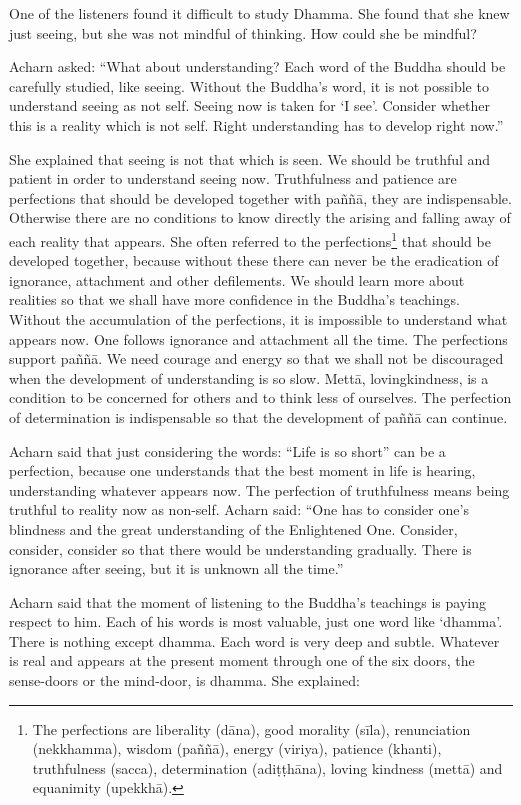 One of the listeners found it difficult to study Dhamma. She found that
she knew just seeing, but she was not mindful of thinking. How could she
be mindful?

Acharn asked: ``What about understanding? Each word of the Buddha should
be carefully studied, like seeing. Without the Buddha's word, it is not
possible to understand seeing as not self. Seeing now is taken for `I
see'. Consider whether this is a reality which is not self. Right
understanding has to develop right now.''

She explained that seeing is not that which is seen. We should be
truthful and patient in order to understand seeing now. Truthfulness and
patience are perfections that should be developed together with paññā,
they are indispensable. Otherwise there are no conditions to know
directly the arising and falling away of each reality that appears. She
often referred to the
perfections\footnote{The perfections are
liberality (dāna), good morality (sīla), renunciation (nekkhamma),
wisdom (paññā), energy (viriya), patience (khanti), truthfulness
(sacca), determination (adiṭṭhāna), loving kindness (mettā) and
equanimity (upekkhā).}  that should
be developed together, because without these there can never be the
eradication of ignorance, attachment and other defilements. We should
learn more about realities so that we shall have more confidence in the
Buddha's teachings. Without the accumulation of the perfections, it is
impossible to understand what appears now. One follows ignorance and
attachment all the time. The perfections support paññā. We need courage
and energy so that we shall not be discouraged when the development of
understanding is so slow. Mettā, lovingkindness, is a condition to be
concerned for others and to think less of ourselves. The perfection of
determination is indispensable so that the development of paññā can
continue.

Acharn said that just considering the words: ``Life is so short'' can be
a perfection, because one understands that the best moment in life is
hearing, understanding whatever appears now. The perfection of
truthfulness means being truthful to reality now as non-self. Acharn
said: ``One has to consider one's blindness and the great understanding
of the Enlightened One. Consider, consider, consider so that there would
be understanding gradually. There is ignorance after seeing, but it is
unknown all the time.''

Acharn said that the moment of listening to the Buddha's teachings is
paying respect to him. Each of his words is most valuable, just one word
like `dhamma'. There is nothing except dhamma. Each word is very deep
and subtle. Whatever is real and appears at the present moment through
one of the six doors, the sense-doors or the mind-door, is dhamma. She
explained:

